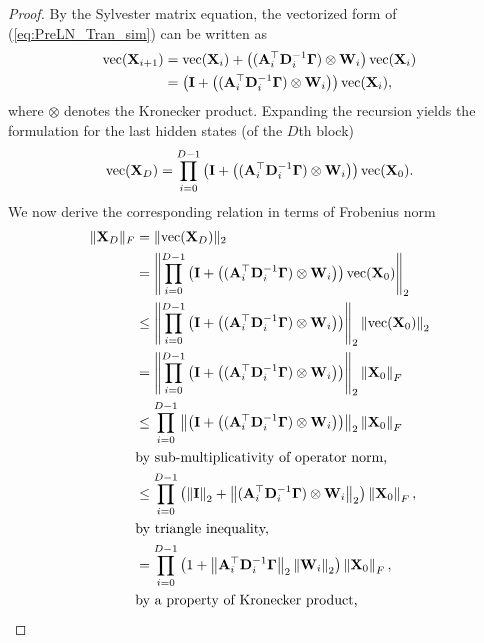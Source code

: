 \documentclass[journal]{IEEEtran}
\newcommand{\bfA}{{\bf A}}
\newcommand{\bfD}{{\bf D}}
\newcommand{\bfI}{{\bf I}}
\newcommand{\bfW}{{\bf W}}
\newcommand{\bfX}{{\bf X}}
\newcommand{\bfGamma}{{\boldsymbol \Gamma}}
\theoremstyle{plain}
\theoremstyle{definition}
\theoremstyle{remark}
\begin{document}
\begin{proof}
    By the Sylvester matrix equation, the vectorized form of (\ref{eq:PreLN_Tran_sim}) can be written as
    \begin{align}
        {\rm vec}(\bfX_{i+1}) &= {\rm vec}(\bfX_{i})  + \left( (\bfA_i^\top \bfD_i^{-1} \bfGamma) \otimes \bfW_i \right){\rm vec}(\bfX_{i}) \\
        &= \left(\bfI + \left(  (\bfA_i^\top \bfD_i^{-1} \bfGamma) \otimes \bfW_i \right) \right) {\rm vec}(\bfX_{i}),
    \end{align}
    where $\otimes$ denotes the Kronecker product. Expanding the recursion yields the formulation for the last hidden states (of the $D$th block)
    \begin{equation}
        {\rm vec}(\bfX_{D}) = \prod_{i=0}^{D-1} \left(\bfI + \left(  (\bfA_i^\top \bfD_i^{-1} \bfGamma) \otimes \bfW_i \right) \right) {\rm vec}(\bfX_0).
    \end{equation}
    We now derive the corresponding relation in terms of Frobenius norm
    \begin{align}
        \| \bfX_D\|_F &= \| {\rm vec}(\bfX_D) \|_2 \\
        &= \left\| \prod_{i=0}^{D-1} \left(\bfI + \left(  (\bfA_i^\top \bfD_i^{-1} \bfGamma) \otimes \bfW_i \right) \right) {\rm vec}(\bfX_0) \right\|_2 \\
        &\leq \left\| \prod_{i=0}^{D-1} \left(\bfI + \left(  (\bfA_i^\top \bfD_i^{-1} \bfGamma) \otimes \bfW_i \right) \right) \right\|_2 \left\|{\rm vec}(\bfX_0)\right\|_2 \\
        &= \left\| \prod_{i=0}^{D-1} \left(\bfI + \left(  (\bfA_i^\top \bfD_i^{-1} \bfGamma) \otimes \bfW_i \right) \right) \right\|_2 \left\|\bfX_0\right\|_F \\
        &\leq \prod_{i=0}^{D-1} \left\|  \left(\bfI + \left(  (\bfA_i^\top \bfD_i^{-1} \bfGamma) \otimes \bfW_i \right) \right) \right\|_2 \left\|\bfX_0\right\|_F \\
        & \text{by sub-multiplicativity of operator norm,}\\
        & \leq \prod_{i=0}^{D-1}\left( \left\|  \bfI \right\|_2 +  \left\| (\bfA_i^\top \bfD_i^{-1} \bfGamma) \otimes \bfW_i \right\|_2 \right)   \left\|\bfX_0\right\|_F, \\
        & \text{by triangle inequality,}\\
        &= \prod_{i=0}^{D-1}\left( 1 +  \left\| \bfA_i^\top \bfD_i^{-1} \bfGamma \right\|_2 \left\| \bfW_i \right\|_2 \right)   \left\|\bfX_0\right\|_F, \\
        & \text{by a property of Kronecker product,} \\

\end{align}
\end{proof}
\end{document}
